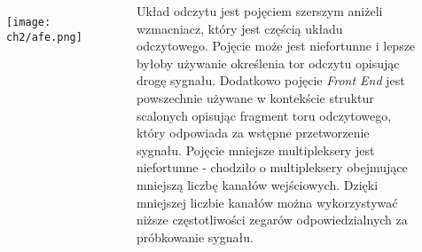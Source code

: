 \begin{frame}[t]
    \begin{block}{\dk}
    \end{block}

    \begin{columns}

        \vspace{-1em}
        \begin{figure}[H]
            \texttt{[image: ch2/afe.png]}
        \end{figure}

    
        {\renewcommand\normalsize{\small}%
\normalsize
Układ odczytu jest pojęciem szerszym aniżeli wzmacniacz, który jest częścią układu odczytowego. Pojęcie może jest niefortunne i lepsze byłoby używanie określenia tor odczytu opisując drogę sygnału. 
Dodatkowo pojęcie \textit{Front End} jest powszechnie używane w kontekście struktur scalonych opisując fragment toru odczytowego, który odpowiada za wstępne przetworzenie sygnału.
Pojęcie mniejsze multipleksery jest niefortunne - chodziło o multipleksery obejmujące mniejszą liczbę kanałów wejściowych. Dzięki mniejszej liczbie kanałów można wykorzystywać niższe częstotliwości zegarów odpowiedzialnych za próbkowanie sygnału.}
    \end{columns}
    
\end{frame}



